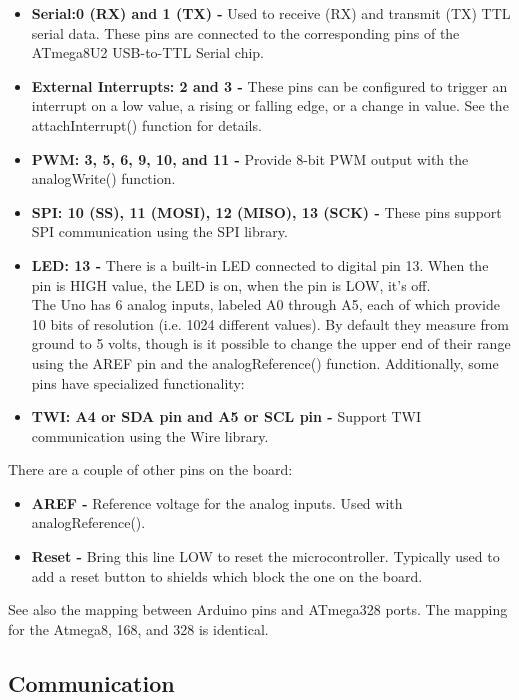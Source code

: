 \documentclass[a4paper, 12pt, notitlepage]{report}
\begin{document}
\begin{itemize}
\item \textbf{Serial:0 (RX) and 1 (TX) -} Used to receive (RX) and transmit (TX) TTL serial data. These pins are connected to the corresponding pins of the ATmega8U2 USB-to-TTL Serial chip.
\item \textbf{External Interrupts: 2 and 3 -} These pins can be configured to trigger an interrupt on a low value, a rising or falling edge, or a change in value. See the attachInterrupt() function for details.
\item \textbf{PWM: 3, 5, 6, 9, 10, and 11 -} Provide 8-bit PWM output with the analogWrite() function.
\item \textbf{SPI: 10 (SS), 11 (MOSI), 12 (MISO), 13 (SCK) -} These pins support SPI communication using the SPI library.
\item \textbf{LED: 13 -} There is a built-in LED connected to digital pin 13. When the pin is HIGH value, the LED is on, when the pin is LOW, it's off.\\
The Uno has 6 analog inputs, labeled A0 through A5, each of which provide 10 bits of resolution (i.e. 1024 different values). By default they measure from ground to 5 volts, though is it possible to change the upper end of their range using the AREF pin and the analogReference() function. Additionally, some pins have specialized functionality:
\item \textbf{TWI: A4 or SDA pin and A5 or SCL pin -} Support TWI communication using the Wire library.

\end{itemize}

There are a couple of other pins on the board:\\

\begin{itemize}
\item \textbf{AREF -} Reference voltage for the analog inputs. Used with analogReference().
\item \textbf{Reset -} Bring this line LOW to reset the microcontroller. Typically used to add a reset button to shields which block the one on the board.

\end{itemize}

See also the mapping between Arduino pins and ATmega328 ports. The mapping for the Atmega8, 168, and 328 is identical.\\

\subsection{Communication}
\end{document}
